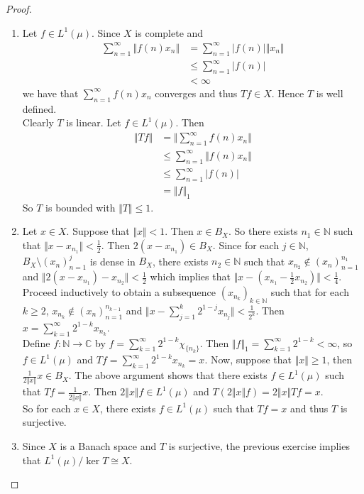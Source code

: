 \documentclass[12pt]{amsart}
\newcommand{\C}{\mathbb{C}}
\newcommand{\N}{\mathbb{N}}
\newcommand{\n}{\Vert}
\begin{document}
\begin{proof}
\begin{enumerate}
\item Let $f \in L^1(\mu)$. Since $X$ is complete and 
\begin{align*}
\sum_{n=1}^{\infty}\n f(n)x_n \n
& = \sum_{n=1}^{\infty} \vert f(n) \vert \n x_n \n \\
& \leq \sum_{n=1}^{\infty} \vert f(n) \vert \\
&< \infty 
\end{align*}
we have that $\sum_{n=1}^{\infty} f(n)x_n $ converges and thus $Tf \in X$. Hence $T$ is well defined. \vspace{.5cm}\\
Clearly $T$ is linear. Let $f \in L^1(\mu)$. Then
\begin{align*}
\n Tf \n 
&= \n  \sum_{n=1}^{\infty} f(n)x_n \n \\
& \leq \sum_{n=1}^{\infty} \n f(n)x_n \n \\
& \leq \sum_{n=1}^{\infty} \vert f(n) \vert \\
&= \n f \n_1
\end{align*}
So $T$ is bounded with $\n T \n \leq 1$.\vspace{.5cm}\\
\item Let $x \in X$. Suppose that $\n x \n < 1$. Then $x \in B_X$. So there exists $n_1 \in \N$ such that $\n x - x_{n_1} \n < \frac{1}{2}$. Then $2(x-x_{n_1}) \in B_X$. Since for each $j \in \N$, $B_X\setminus (x_n)_{n=1}^j$ is dense in $B_X$, there exists $n_2 \in \N$ such that $x_{n_2} \not \in (x_n)_{n=1}^{n_1}$ and $\n 2(x- x_{n_1}) - x_{n_2} \n < \frac{1}{2}$ which implies that $\n x- (x_{n_1} - \frac{1}{2}x_{n_2}) \n < \frac{1}{4}$. \vspace{.5cm}\\ 
Proceed inductively to obtain a subsequence $(x_{n_k})_{k \in \N}$ such that for each $k \geq 2$, $x_{n_k} \not \in (x_n)_{n=1}^{n_{k-1}}$ and $\n x - \sum_{j=1}^k 2^{1-j}x_{n_j} \n < \frac{1}{2^k}$. Then $x = \sum_{k=1}^{\infty}2^{1-k}x_{n_k}$. \vspace{.5cm} \\ 
Define $f:\N \rightarrow \C$ by $f = \sum_{k=1}^{\infty}2^{1-k}\chi_{\{n_k\}}$. Then $\n f \n_1 = \sum_{k=1}^{\infty}2^{1-k}< \infty$, so $f \in L^1(\mu)$ and $Tf = \sum_{k=1}^{\infty}2^{1-k}x_{n_k} = x$. Now, suppose that $\n x \n \geq 1$, then $\frac{1}{2\n x \n}x \in B_X$. The above argument shows that there exists $f \in L^1(\mu)$ such that $Tf = \frac{1}{2\n x \n}x$. Then $2 \n x \n f \in L^1(\mu)$ and $T(2 \n x \n f) = 2 \n x \n Tf =x$. \\
So for each $x \in X$, there exists $f \in L^1(\mu)$ such that $Tf = x$ and thus $T$ is surjective. 
\item Since $X$ is a Banach space and $T$ is surjective, the previous exercise implies that $L^1(\mu)/\ker T \cong X$. 
\end{enumerate}
\end{proof}
\end{document}
